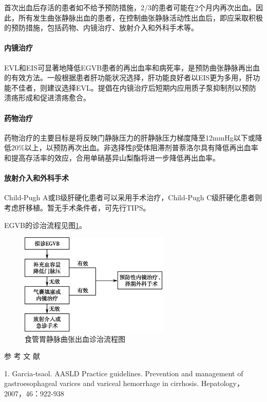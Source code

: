 首次出血后存活的患者如不给予预防措施，2/3的患者可能在2个月内再次出血。因此，所有发生曲张静脉出血的患者，在控制曲张静脉活动性出血后，即应采取积极的预防措施，包括药物、内镜治疗、放射介入和外科手术等。

\paragraph{内镜治疗}

EVL和EIS可显著地降低EGVB患者的再出血率和病死率，是预防曲张静脉再出血的有效方法。一般根据患者肝功能状况选择，肝功能良好者以EIS更为多用，肝功能不佳者，则建议选择EVL。提倡在内镜治疗后短期内应用质子泵抑制剂以预防溃疡形成和促进溃疡愈合。

\paragraph{药物治疗}

药物治疗的主要目标是将反映门静脉压力的肝静脉压力梯度降至12mmHg以下或降低20\%以上，以预防再次出血。非选择性β受体阻滞剂普萘洛尔具有降低再出血率和提高存活率的效应，合用单硝基异山梨酯将进一步降低再出血率。

\paragraph{放射介入和外科手术}

Child-Pugh A或B级肝硬化患者可以采用手术治疗，Child-Pugh
C级肝硬化患者则考虑肝移植。暂无手术条件者，可先行TIPS。

EGVB的诊治流程见图\ref{fig116-1}。

\begin{figure}[!htbp]
 \centering
 \includegraphics[width=2.8125in,height=1.90625in]{./images/Image00491.jpg}
 \captionsetup{justification=centering}
 \caption{食管胃静脉曲张出血诊治流程图}
 \label{fig116-1}
  \end{figure} \hypertarget{text00328.htmlux5cux23CHP11-7-1-5}{}
参 考 文 献

1. Garcia-tsaol. AASLD Practice guidelines. Prevention and management of
gastroesophageal varices and variceal hemorrhage in cirrhosis.
Hepatology，2007，46：922-938

